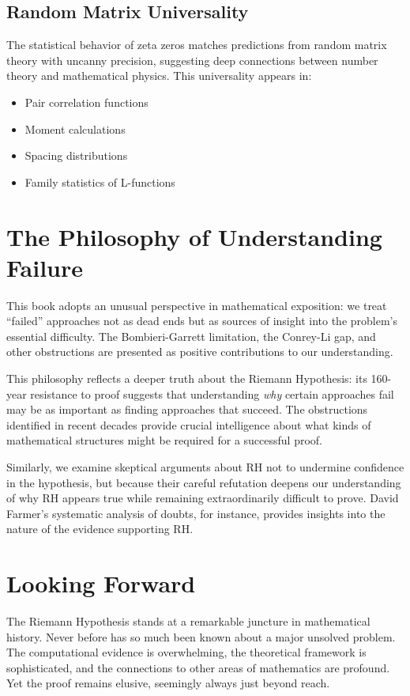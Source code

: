 \subsection*{Random Matrix Universality}

The statistical behavior of zeta zeros matches predictions from random matrix theory with uncanny precision, suggesting deep connections between number theory and mathematical physics. This universality appears in:
\begin{itemize}
\item Pair correlation functions
\item Moment calculations  
\item Spacing distributions
\item Family statistics of L-functions
\end{itemize}

\section*{The Philosophy of Understanding Failure}

This book adopts an unusual perspective in mathematical exposition: we treat ``failed'' approaches not as dead ends but as sources of insight into the problem's essential difficulty. The Bombieri-Garrett limitation, the Conrey-Li gap, and other obstructions are presented as positive contributions to our understanding.

This philosophy reflects a deeper truth about the Riemann Hypothesis: its 160-year resistance to proof suggests that understanding \emph{why} certain approaches fail may be as important as finding approaches that succeed. The obstructions identified in recent decades provide crucial intelligence about what kinds of mathematical structures might be required for a successful proof.

Similarly, we examine skeptical arguments about RH not to undermine confidence in the hypothesis, but because their careful refutation deepens our understanding of why RH appears true while remaining extraordinarily difficult to prove. David Farmer's systematic analysis of doubts, for instance, provides insights into the nature of the evidence supporting RH.

\section*{Looking Forward}

The Riemann Hypothesis stands at a remarkable juncture in mathematical history. Never before has so much been known about a major unsolved problem. The computational evidence is overwhelming, the theoretical framework is sophisticated, and the connections to other areas of mathematics are profound. Yet the proof remains elusive, seemingly always just beyond reach.

